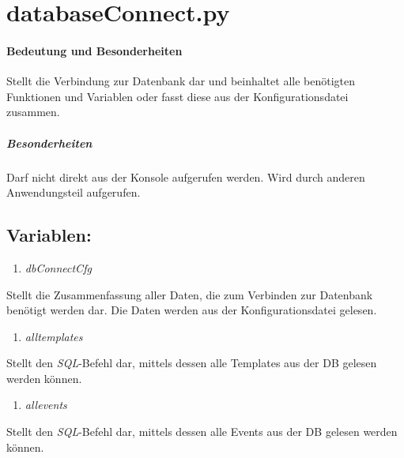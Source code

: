 \documentclass[12pt,parskip=full, pagea4]{scrreprt}
\begin{document}
			\leftskip=0cm
							
			\section{databaseConnect.py}
			\paragraph{Bedeutung und Besonderheiten}Stellt die Verbindung zur Datenbank dar und beinhaltet alle benötigten Funktionen und Variablen oder fasst diese aus der Konfigurationsdatei zusammen.
			\subparagraph{Besonderheiten}Darf nicht direkt aus der Konsole aufgerufen werden. Wird durch anderen Anwendungsteil aufgerufen.
			\subsection{Variablen:}
			\begin{enumerate}
				\item \textit{dbConnectCfg} 
			\end{enumerate}
			\leftskip=1.5cm Stellt die Zusammenfassung aller Daten, die zum Verbinden zur Datenbank benötigt werden dar. Die Daten werden aus der Konfigurationsdatei gelesen.
			\begin{enumerate}[resume]
				\item \textit{alltemplates}
			\end{enumerate}
			\leftskip=1.5cm	Stellt den \textit{SQL}-Befehl dar, mittels dessen alle Templates aus der DB gelesen werden können.
			\begin{enumerate}[resume]
				\item \textit{allevents}
			\end{enumerate}
			\leftskip=1.5cm	Stellt den \textit{SQL}-Befehl dar, mittels dessen alle Events aus der DB gelesen werden können.
\end{document}

